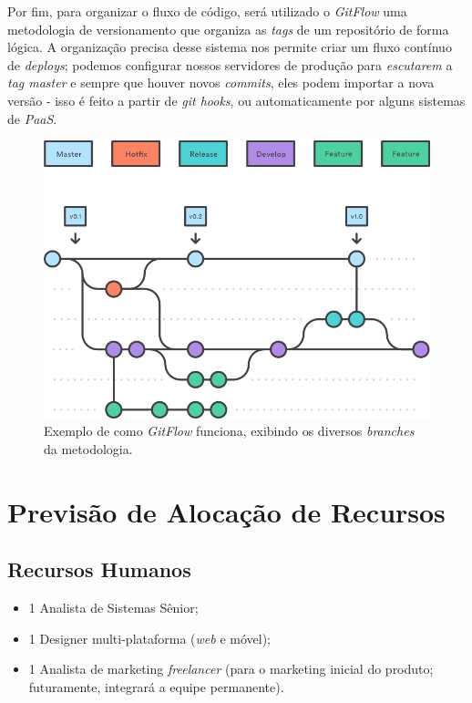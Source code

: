 \documentclass[a4paper]{abnt}
\begin{document}
Por fim, para organizar o fluxo de código, será utilizado o \emph{GitFlow}\cite{gitflow} uma metodologia de versionamento que organiza as \emph{tags} de um repositório de forma lógica. A organização precisa desse sistema nos permite criar um fluxo contínuo de \emph{deploys}; podemos configurar nossos servidores de produção para \emph{escutarem} a \emph{tag master} e sempre que houver novos \emph{commits}, eles podem importar a nova versão - isso é feito a partir de \emph{git hooks}, ou automaticamente por alguns sistemas de \emph{PaaS}.

\begin{figure}
	\centering
	\includegraphics[scale=0.65]{img/gitflow.png}
	\caption{Exemplo de como \emph{GitFlow} funciona, exibindo os diversos \emph{branches} da metodologia.}
\end{figure}

\section{Previsão de Alocação de Recursos}

\subsection*{Recursos Humanos}
\begin{itemize}
	\item 1 Analista de Sistemas Sênior;
	\item 1 Designer multi-plataforma (\textit{web} e móvel);\footnotemark
	\item 1 Analista de marketing \emph{freelancer} (para o marketing inicial do produto; futuramente, integrará a equipe permanente).
\end{itemize}
\end{document}
